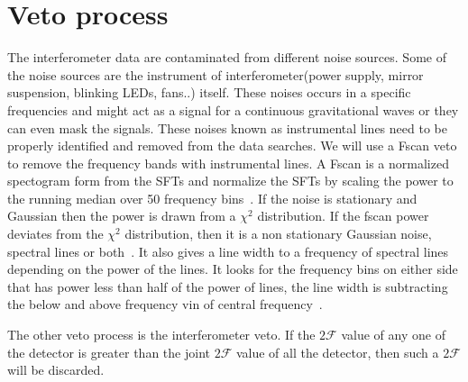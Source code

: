 \documentclass{ttuthes2007}
\begin{document}
\section{Veto process}
The interferometer data are contaminated from different noise sources. Some of
the noise sources are the instrument of interferometer(power supply, mirror
suspension, blinking LEDs, fans..) itself. These noises occurs in a specific
frequencies and might act as a signal for a continuous gravitational waves or
they can even mask the signals.  These noises known as instrumental lines need
to be properly identified and removed from the data searches. We will use a
Fscan veto to remove the frequency bands with instrumental lines. A Fscan is a
normalized spectogram form from the SFTs and normalize the SFTs by scaling the
power to the running median over 50 frequency bins~\cite{Aasi_2015}. If the
noise is stationary and Gaussian then the power is drawn from a $\chi^2$
distribution. If the fscan power deviates from the $\chi^2$ distribution, then
it is a non stationary Gaussian noise, spectral lines or both~\cite{Aasi_2015}.
It also gives a line width to a frequency of spectral lines depending on the
power of the lines. It looks for the frequency bins on either side that has
power less than half of the power of lines, the line width is subtracting the
below and above frequency vin of central frequency~\cite{Coughlin_2010}.

The other veto process is the interferometer veto. If the $2\mathcal{F}$ value
of any one of the detector is greater than the joint $2\mathcal{F}$ value of all
the detector, then such a $2\mathcal{F}$ will be discarded. 
\end{document}
